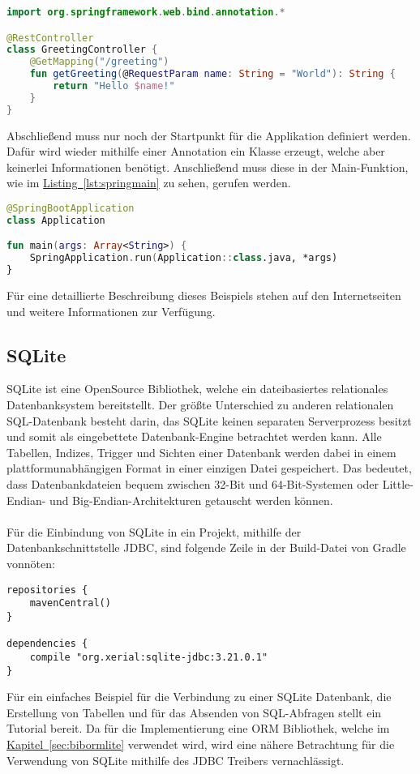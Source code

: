 \begin{lstlisting}[style=lstStyleFramed, language=Kotlin, caption={Beispiel: Spring Controller}, label=lst:springcontroller, float]
import org.springframework.web.bind.annotation.*

@RestController
class GreetingController {
	@GetMapping("/greeting")
	fun getGreeting(@RequestParam name: String = "World"): String {
		return "Hello $name!"
	}
}
\end{lstlisting}
Abschließend muss nur noch der Startpunkt für die Applikation definiert werden. Dafür wird wieder mithilfe einer Annotation ein Klasse erzeugt, welche aber keinerlei Informationen benötigt. Anschließend muss diese in der Main-Funktion, wie im \hyperref[lst:springmain]{Listing~\ref{lst:springmain}} zu sehen, gerufen werden. 
\begin{lstlisting}[style=lstStyleFramed, language=Kotlin, caption={Beispiel: Spring Application Class}, label=lst:springmain, float]
@SpringBootApplication
class Application

fun main(args: Array<String>) {
	SpringApplication.run(Application::class.java, *args)
}
\end{lstlisting}
Für eine detaillierte Beschreibung dieses Beispiels stehen auf den Internetseiten \cite{springTutorialKotlin} und \cite{springTutorial} weitere Informationen zur Verfügung.

\subsection{SQLite}\label{sec:bibsqlite}
SQLite ist eine OpenSource Bibliothek, welche ein dateibasiertes relationales Datenbanksystem bereitstellt. Der größte Unterschied zu anderen relationalen SQL-Datenbank besteht darin, das SQLite keinen separaten Serverprozess besitzt und somit als eingebettete Datenbank-Engine betrachtet werden kann. Alle Tabellen, Indizes, Trigger und Sichten einer Datenbank werden dabei in einem plattformunabhängigen Format in einer einzigen Datei gespeichert. Das bedeutet, dass Datenbankdateien bequem zwischen 32-Bit und 64-Bit-Systemen oder Little-Endian- und Big-Endian-Architekturen getauscht werden können.\cite{sqliteAbout}\\
\\
Für die Einbindung von SQLite in ein Projekt, mithilfe der Datenbankschnittstelle \gls{JDBC}, sind folgende Zeile in der Build-Datei von Gradle vonnöten:
\begin{lstlisting}[style=lstStyleFramed, language=Gradle, caption={Einbindung der Bibliothek SQLite mithilfe von Gradle}, label=lst:sqlite, float]
repositories {
	mavenCentral()
}

dependencies {
	compile "org.xerial:sqlite-jdbc:3.21.0.1"
}
\end{lstlisting}
Für ein einfaches Beispiel für die Verbindung zu einer SQLite Datenbank, die Erstellung von Tabellen und für das Absenden von SQL-Abfragen stellt \cite{sqliteJDBCTutorial} ein Tutorial bereit. Da für die Implementierung eine \gls{ORM} Bibliothek, welche im \hyperref[sec:bibormlite]{Kapitel~\ref{sec:bibormlite}} verwendet wird, wird eine nähere Betrachtung für die Verwendung von SQLite mithilfe des \gls{JDBC} Treibers vernachlässigt.

